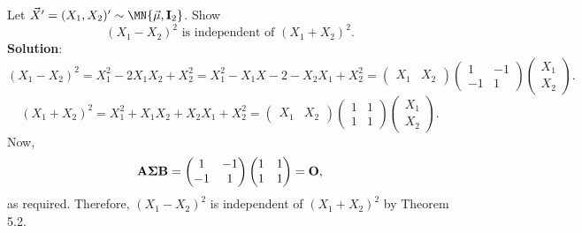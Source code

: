 \begin{Example}{}{}
    Let $ \Vector{X}'=(X_1,X_2)' \sim \MN{\Vector{\mu},\Matrix{I}_2} $. Show
    \[ (X_1-X_2)^2\text{ is independent of }(X_1+X_2)^2. \]
    \tcblower{}
    \textbf{Solution}:
    \[ (X_1-X_2)^2=X_1^2-2X_1X_2+X_2^2=X_1^2-X_1X-2-X_2X_1+X_2^2=
        \begin{pmatrix}
            X_1 & X_2
        \end{pmatrix}\begin{pmatrix}
            1  & -1 \\
            -1 & 1
        \end{pmatrix}\begin{pmatrix}
            X_1 \\
            X_2
        \end{pmatrix}. \]
    \[ (X_1+X_2)^2=X_1^2+X_1X_2+X_2X_1+X_2^2=
        \begin{pmatrix}
            X_1 &
            X_2
        \end{pmatrix}
        \begin{pmatrix}
            1 & 1 \\
            1 & 1
        \end{pmatrix}\begin{pmatrix}
            X_1 \\
            X_2
        \end{pmatrix}. \]
    Now,
    \[ \mathbf{A\Sigma B}=\begin{pmatrix}
            1  & -1 \\
            -1 & 1
        \end{pmatrix}\begin{pmatrix}
            1 & 1 \\
            1 & 1
        \end{pmatrix}=\mathbf{O}, \]
    as required. Therefore, $ (X_1-X_2)^2 $ is independent of $ (X_1+X_2)^2 $ by Theorem 5.2.
\end{Example}
